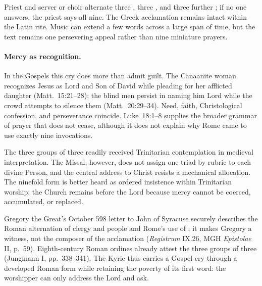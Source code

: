 
Priest and server or choir alternate three , three , and three further ; if no one answers, the priest says all nine. The Greek acclamation remains intact within the Latin rite. Music can extend a few words across a large span of time, but the text remains one persevering appeal rather than nine miniature prayers.

\paragraph{Mercy as recognition.}
In the Gospels this cry does more than admit guilt. The Canaanite woman recognizes Jesus as Lord and Son of David while pleading for her afflicted daughter (Matt.~15:21--28); the blind men persist in naming him Lord while the crowd attempts to silence them (Matt.~20:29--34). Need, faith, Christological confession, and perseverance coincide. Luke~18:1--8 supplies the broader grammar of prayer that does not cease, although it does not explain why Rome came to use exactly nine invocations.

The three groups of three readily received Trinitarian contemplation in medieval interpretation. The Missal, however, does not assign one triad by rubric to each divine Person, and the central address to Christ resists a mechanical allocation. The ninefold form is better heard as ordered insistence within Trinitarian worship: the Church remains before the Lord because mercy cannot be coerced, accumulated, or replaced.

Gregory the Great's October 598 letter to John of Syracuse securely describes the Roman alternation of clergy and people and Rome's use of ; it makes Gregory a witness, not the composer of the acclamation (\emph{Registrum} IX.26, MGH \emph{Epistolae} II, p.~59). Eighth-century Roman ordines already attest the three groups of three (Jungmann I, pp.~338--341). The Kyrie thus carries a Gospel cry through a developed Roman form while retaining the poverty of its first word: the worshipper can only address the Lord and ask.
